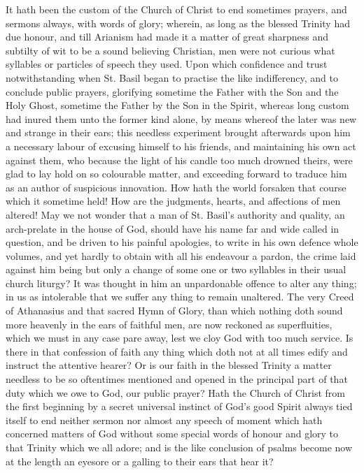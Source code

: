 It hath been the custom of the Church of Christ to end sometimes prayers, and sermons always, with words of glory; wherein, as long as the blessed Trinity had due honour, and till Arianism had made it a matter of great sharpness and subtilty of wit to be a sound believing Christian, men were not curious what syllables or particles of speech they used. Upon which confidence and trust notwithstanding when St. Basil began to practise the like indifferency, and to conclude public prayers, glorifying sometime the Father with the Son and the Holy Ghost, sometime the Father by the Son in the Spirit, whereas long custom had inured them unto the former kind alone, by means whereof the later was new and strange in their ears; this needless experiment brought afterwards upon him a necessary labour of excusing himself to his friends, and maintaining his own act against them, who because the light of his candle too much drowned theirs, were glad to lay hold on so colourable matter, and exceeding forward to traduce him as an author of suspicious innovation.
How hath the world forsaken that course which it sometime held! How are the judgments, hearts, and affections of men altered! May we not wonder that a man of St. Basil’s authority and quality, an arch-prelate in the house of God, should have his name far and wide called in question, and be  driven to his painful apologies, to write in his own defence whole volumes, and yet hardly to obtain with all his endeavour a pardon, the crime laid against him being but only a change of some one or two syllables in their usual church liturgy? It was thought in him an unpardonable offence to alter any thing; in us as intolerable that we suffer any thing to remain unaltered. The very Creed of Athanasius and that sacred Hymn of Glory, than which nothing doth sound more heavenly in the ears of faithful men, are now reckoned as superfluities, which we must in any case pare away, lest we cloy God with too much service. Is there in that confession of faith any thing which doth not at all times edify and instruct the attentive hearer? Or is our faith in the blessed Trinity a matter needless to be so oftentimes mentioned and opened in the principal part of that duty which we owe to God, our public prayer? Hath the Church of Christ from the first beginning by a secret universal instinct of God’s good Spirit always tied itself to end neither sermon nor almost any speech of moment which hath concerned matters of God without some special words of honour and glory to that Trinity which we all adore; and is the like conclusion of psalms become now at the length an eyesore or a galling to their ears that hear it?
